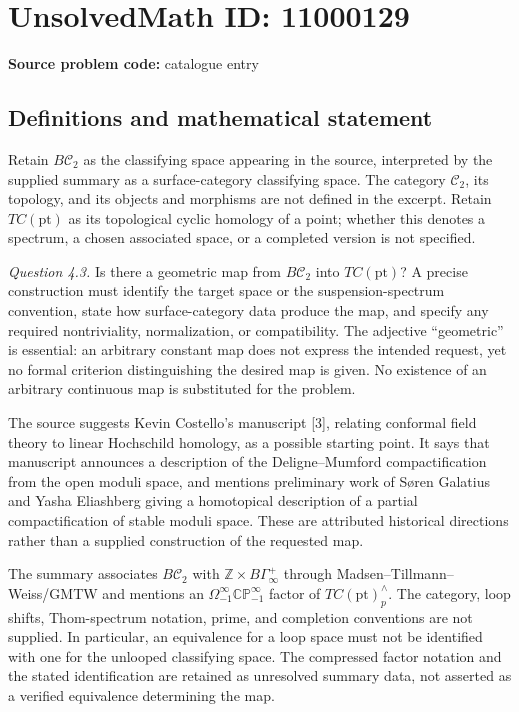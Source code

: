 \documentclass[11pt]{article}
\newcommand{\Z}{\mathbb{Z}}
\begin{document}
\section*{UnsolvedMath ID: 11000129}
\textbf{Source problem code:} catalogue entry
\subsection{Definitions and mathematical statement}
Retain \(B\mathcal C_2\) as the classifying space appearing in the source, interpreted by the supplied summary as a surface-category classifying space. The category \(\mathcal C_2\), its topology, and its objects and morphisms are not defined in the excerpt. Retain \(TC(\mathrm{pt})\) as its topological cyclic homology of a point; whether this denotes a spectrum, a chosen associated space, or a completed version is not specified.

\emph{Question 4.3.} Is there a geometric map from \(B\mathcal C_2\) into \(TC(\mathrm{pt})\)? A precise construction must identify the target space or the suspension-spectrum convention, state how surface-category data produce the map, and specify any required nontriviality, normalization, or compatibility. The adjective ``geometric'' is essential: an arbitrary constant map does not express the intended request, yet no formal criterion distinguishing the desired map is given. No existence of an arbitrary continuous map is substituted for the problem.

The source suggests Kevin Costello's manuscript [3], relating conformal field theory to linear Hochschild homology, as a possible starting point. It says that manuscript announces a description of the Deligne--Mumford compactification from the open moduli space, and mentions preliminary work of S\o ren Galatius and Yasha Eliashberg giving a homotopical description of a partial compactification of stable moduli space. These are attributed historical directions rather than a supplied construction of the requested map.

The summary associates \(B\mathcal C_2\) with \(\Z\times B\Gamma_\infty^+\) through Madsen--Tillmann--Weiss/GMTW and mentions an \(\Omega^\infty_{-1}\mathbb{CP}^{\infty}_{-1}\) factor of \(TC(\mathrm{pt})^{\wedge}_p\). The category, loop shifts, Thom-spectrum notation, prime, and completion conventions are not supplied. In particular, an equivalence for a loop space must not be identified with one for the unlooped classifying space. The compressed factor notation and the stated identification are retained as unresolved summary data, not asserted as a verified equivalence determining the map.
\end{document}

